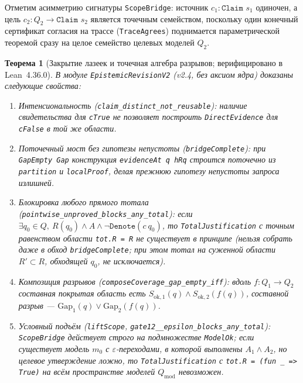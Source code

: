 \documentclass[11pt,a4paper]{article}
\theoremstyle{preprintthm}
\newtheorem{theorem}{Теорема}[section]
\theoremstyle{preprintdef}
\begin{document}
Отметим асимметрию сигнатуры \texttt{ScopeBridge}: источник $c_1:\texttt{Claim } s_1$ одиночен, а цель $c_2:Q_2\to\texttt{Claim } s_2$ является точечным семейством, поскольку один конечный сертификат согласия на трассе (\texttt{TraceAgrees}) поднимается параметрической теоремой сразу на целое семейство целевых моделей $Q_2$.

\begin{theorem}[Закрытие лазеек и точечная алгебра разрывов; верифицировано в Lean~4.36.0]
\label{thm:kernel_core}
В модуле \texttt{EpistemicRevisionV2} (v2.4, без аксиом ядра) доказаны следующие свойства:
\begin{enumerate}
  \item \emph{Интенсиональность (\texttt{claim\_\allowbreak distinct\_\allowbreak not\_\allowbreak reusable}):} наличие свидетельства для \texttt{cTrue} не позволяет построить \texttt{DirectEvidence} для \texttt{cFalse} в той же области.
  \item \emph{Поточечный мост без гипотезы непустоты (\texttt{bridgeComplete}):} при \texttt{GapEmpty Gap} конструкция \texttt{evidenceAt q hRq} строится поточечно из \texttt{partition} и \texttt{localProof}, делая прежнюю гипотезу непустоты запроса излишней.
  \item \emph{Блокировка любого прямого тотала (\texttt{pointwise\_\allowbreak unproved\_\allowbreak blocks\_\allowbreak any\_\allowbreak total}):} если $\exists q_0\in Q,\ R(q_0)\land A\land \neg\texttt{Denote}(c\ q_0)$, то \texttt{TotalJustification} с точным равенством области \texttt{tot.R = R} \emph{не существует в принципе} (нельзя собрать даже в обход \texttt{bridgeComplete}; при этом тотал на суженной области $R'\subset R$, обходящей $q_0$, не исключается).
  \item \emph{Композиция разрывов (\texttt{composeCoverage\_\allowbreak gap\_\allowbreak empty\_\allowbreak iff}):} вдоль $f:Q_1\to Q_2$ составная покрытая область есть $S_{\mathrm{ok},1}(q)\land S_{\mathrm{ok},2}(f(q))$, составной разрыв --- $\mathrm{Gap}_1(q)\lor \mathrm{Gap}_2(f(q))$.
  \item \emph{Условный подъём (\texttt{liftScope}, \texttt{gate12\_\_\allowbreak epsilon\_\allowbreak blocks\_\allowbreak any\_\allowbreak total}):} \texttt{ScopeBridge} действует строго на подмножестве \texttt{ModelOk}; если существует модель $m_0$ с $\varepsilon$-переходами, в которой выполнены $A_1\land A_2$, но целевое утверждение ложно, то \texttt{TotalJustification} с \texttt{tot.R = (fun \_ => True)} на всём пространстве моделей $Q_{\mathrm{mod}}$ невозможен.
\end{enumerate}
\end{theorem}
\end{document}
